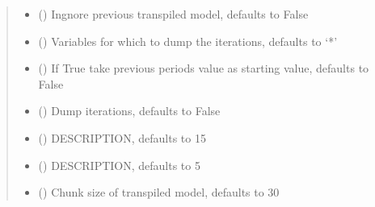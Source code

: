 \documentclass[letterpaper,10pt,english]{sphinxmanual}
\begin{document}
\begin{fulllineitems}
\begin{fulllineitems}
\begin{quote}
\begin{description}
\begin{itemize}
\item {} 
\sphinxAtStartPar
{} (\sphinxstyleliteralemphasis{\sphinxupquote{, }}) \textendash{} Ingnore previous transpiled model, defaults to False

\item {} 
\sphinxAtStartPar
{} (\sphinxstyleliteralemphasis{\sphinxupquote{, }}) \textendash{} Variables for which to dump the iterations, defaults to ‘*’

\item {} 
\sphinxAtStartPar
{} (\sphinxstyleliteralemphasis{\sphinxupquote{, }}) \textendash{} If True take previous periods value as starting value, defaults to False

\item {} 
\sphinxAtStartPar
{} (\sphinxstyleliteralemphasis{\sphinxupquote{, }}) \textendash{} Dump iterations, defaults to False

\item {} 
\sphinxAtStartPar
{} (\sphinxstyleliteralemphasis{\sphinxupquote{, }}) \textendash{} DESCRIPTION, defaults to 15

\item {} 
\sphinxAtStartPar
{} (\sphinxstyleliteralemphasis{\sphinxupquote{, }}) \textendash{} DESCRIPTION, defaults to 5

\item {} 
\sphinxAtStartPar
{} (\sphinxstyleliteralemphasis{\sphinxupquote{, }}) \textendash{} Chunk size of transpiled model, defaults to 30


\end{itemize}
\end{description}
\end{quote}
\end{fulllineitems}
\end{fulllineitems}
\end{document}
